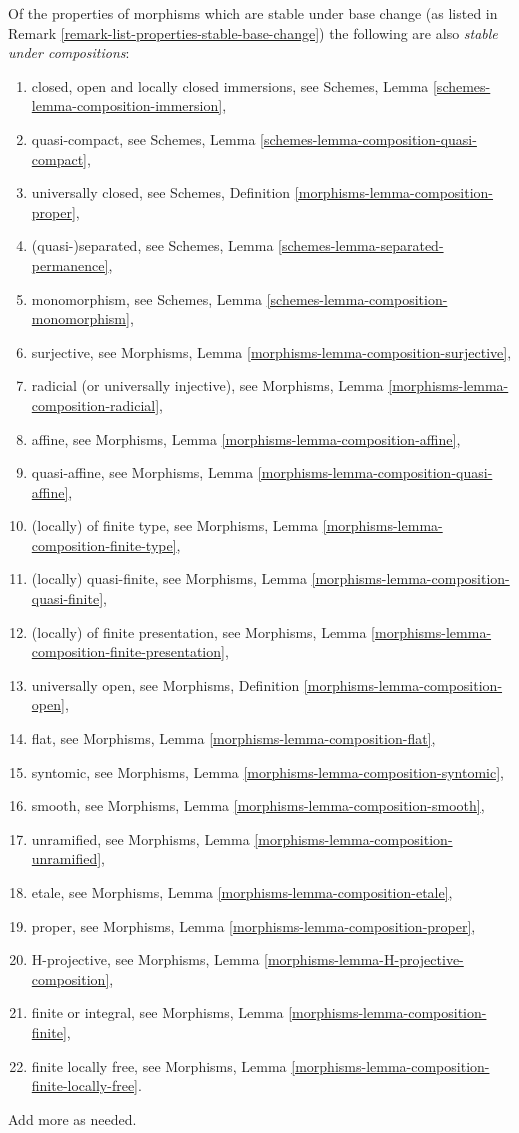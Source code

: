 \begin{remark}
\label{remark-list-properties-stable-composition}
Of the properties of morphisms which are stable under base change
(as listed in
Remark \ref{remark-list-properties-stable-base-change})
the following are also {\it stable under compositions}:
\begin{enumerate}
\item closed, open and locally closed immersions, see
Schemes, Lemma \ref{schemes-lemma-composition-immersion},
\item quasi-compact, see
Schemes, Lemma \ref{schemes-lemma-composition-quasi-compact},
\item universally closed, see
Schemes, Definition \ref{morphisms-lemma-composition-proper},
\item (quasi-)separated, see
Schemes, Lemma \ref{schemes-lemma-separated-permanence},
\item monomorphism, see
Schemes, Lemma \ref{schemes-lemma-composition-monomorphism},
\item surjective, see
Morphisms, Lemma \ref{morphisms-lemma-composition-surjective},
\item radicial (or universally injective), see
Morphisms, Lemma \ref{morphisms-lemma-composition-radicial},
\item affine, see
Morphisms, Lemma \ref{morphisms-lemma-composition-affine},
\item quasi-affine, see
Morphisms, Lemma \ref{morphisms-lemma-composition-quasi-affine},
\item (locally) of finite type, see
Morphisms, Lemma \ref{morphisms-lemma-composition-finite-type},
\item (locally) quasi-finite, see
Morphisms, Lemma \ref{morphisms-lemma-composition-quasi-finite},
\item (locally) of finite presentation, see
Morphisms, Lemma \ref{morphisms-lemma-composition-finite-presentation},
\item universally open, see
Morphisms, Definition \ref{morphisms-lemma-composition-open},
\item flat, see
Morphisms, Lemma \ref{morphisms-lemma-composition-flat},
\item syntomic, see
Morphisms, Lemma \ref{morphisms-lemma-composition-syntomic},
\item smooth, see
Morphisms, Lemma \ref{morphisms-lemma-composition-smooth},
\item unramified, see
Morphisms, Lemma \ref{morphisms-lemma-composition-unramified},
\item etale, see
Morphisms, Lemma \ref{morphisms-lemma-composition-etale},
\item proper, see
Morphisms, Lemma \ref{morphisms-lemma-composition-proper},
\item H-projective, see
Morphisms, Lemma \ref{morphisms-lemma-H-projective-composition},
\item finite or integral, see
Morphisms, Lemma \ref{morphisms-lemma-composition-finite},
\item finite locally free, see
Morphisms, Lemma \ref{morphisms-lemma-composition-finite-locally-free}.
\end{enumerate}
Add more as needed.
\end{remark}

